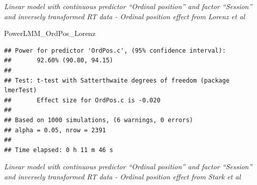 \documentclass[
]{article}
\newenvironment{Shaded}{\begin{snugshade}}{\end{snugshade}}
\newcommand{\AttributeTok}[1]{\textcolor[rgb]{0.77,0.63,0.00}{#1}}
\newcommand{\CommentTok}[1]{\textcolor[rgb]{0.56,0.35,0.01}{\textit{#1}}}
\newcommand{\FunctionTok}[1]{\textcolor[rgb]{0.00,0.00,0.00}{#1}}
\newcommand{\NormalTok}[1]{#1}
\newcommand{\OtherTok}[1]{\textcolor[rgb]{0.56,0.35,0.01}{#1}}
\newcommand{\SpecialCharTok}[1]{\textcolor[rgb]{0.00,0.00,0.00}{#1}}
\newcommand{\StringTok}[1]{\textcolor[rgb]{0.31,0.60,0.02}{#1}}
\begin{document}
\emph{Linear model with continuous predictor ``Ordinal position'' and
factor ``Session'' and inversely transformed RT data - Ordinal position
effect from Lorenz et al}

\begin{Shaded}
\end{Shaded}

\begin{Shaded}
\begin{Highlighting}[]
\NormalTok{PowerLMM\_OrdPos\_Lorenz}
\end{Highlighting}
\end{Shaded}

\begin{verbatim}
## Power for predictor 'OrdPos.c', (95% confidence interval):
##       92.60% (90.80, 94.15)
## 
## Test: t-test with Satterthwaite degrees of freedom (package lmerTest)
##       Effect size for OrdPos.c is -0.020
## 
## Based on 1000 simulations, (6 warnings, 0 errors)
## alpha = 0.05, nrow = 2391
## 
## Time elapsed: 0 h 11 m 46 s
\end{verbatim}

\emph{Linear model with continuous predictor ``Ordinal position'' and
factor ``Session'' and inversely transformed RT data - Ordinal position
effect from Stark et al}

\begin{Shaded}
\end{Shaded}
\end{document}
